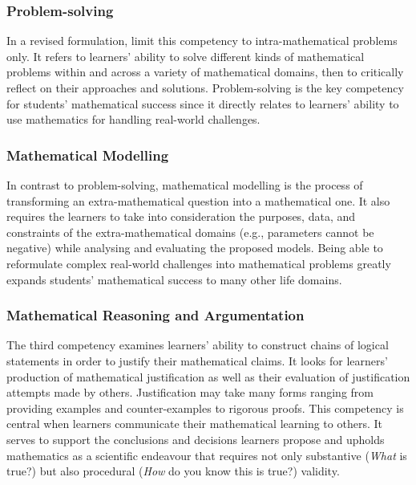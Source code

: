 \documentclass[
    a4paper,                %
    11pt,                   %
    stu,                    %
    donotrepeattitle,       %
    floatsintext,           %
    biblatex,               %
    colorlinks=true,        %
    linkcolor=red,          %
    anchorcolor=black,      %
    citecolor=blue,         %
    urlcolor=blue,          %
    bookmarks=true,         %
    bookmarksopen=false,    %
    bookmarksnumbered=true, %
    dvipsnames              %
]{apa7}
\begin{document}
\subsubsection{Problem-solving}

In a revised formulation, \textcite{niss:2019} limit this competency to intra-mathematical problems only. It refers to learners' ability to solve different kinds of mathematical problems within and across a variety of mathematical domains, then to critically reflect on their approaches and solutions. Problem-solving is the key competency for students' mathematical success since it directly relates to learners' ability to use mathematics for handling real-world challenges.

\subsubsection{Mathematical Modelling}

In contrast to problem-solving, mathematical modelling is the process of transforming an extra-mathematical question into a mathematical one. It also requires the learners to take into consideration the purposes, data, and constraints of the extra-mathematical domains (e.g., parameters cannot be negative) while analysing and evaluating the proposed models. Being able to reformulate complex real-world challenges into mathematical problems greatly expands students' mathematical success to many other life domains.

\subsubsection{Mathematical Reasoning and Argumentation}

The third competency examines learners' ability to construct chains of logical statements in order to justify their mathematical claims. It looks for learners' production of mathematical justification as well as their evaluation of justification attempts made by others. Justification may take many forms ranging from providing examples and counter-examples to rigorous proofs. This competency is central when learners communicate their mathematical learning to others. It serves to support the conclusions and decisions learners propose and upholds mathematics as a scientific endeavour that requires not only substantive (\emph{What} is true?) but also procedural (\emph{How} do you know this is true?) validity.
\end{document}
